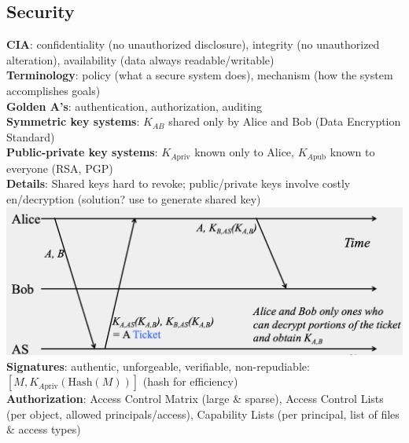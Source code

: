 \documentclass{article}
\begin{document}
\begin{multicols*}{3}
\section{Security}
\textbf{CIA}: confidentiality (no unauthorized disclosure), integrity (no unauthorized alteration), availability (data always readable/writable) \\
\textbf{Terminology}: policy (what a secure system does), mechanism (how the system accomplishes goals) \\
\textbf{Golden A's}: authentication, authorization, auditing \\
\textbf{Symmetric key systems}: $K_{AB}$ shared only by Alice and Bob (Data Encryption Standard) \\
\textbf{Public-private key systems}: $K_{A\text{priv}}$ known only to Alice, $K_{A\text{pub}}$ known to everyone (RSA, PGP) \\
\textbf{Details}: Shared keys hard to revoke; public/private keys involve costly en/decryption (solution? use to generate shared key) \\
\includegraphics[width=\columnwidth]{indierect.png}
\textbf{Signatures}: authentic, unforgeable, verifiable, non-repudiable: $[M, K_{A\text{priv}}(\text{Hash}(M))]$ (hash for efficiency) \\
\textbf{Authorization}: Access Control Matrix (large \& sparse), Access Control Lists (per object, allowed principals/access), Capability Lists (per principal, list of files \& access types)

\end{multicols*}
\end{document}
